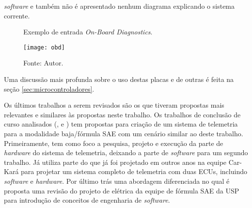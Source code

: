 \textit{software} e também não é apresentado nenhum diagrama explicando o sistema corrente.    

\begin{figure}[!htb]
	\centering
		\caption{Exemplo de entrada \textit{On-Board Diagnostics}.}
		\texttt{[image: obd]} 
		\caption*{Fonte: Autor.}
		\label{fig:obd}
\end{figure}

Uma discussão mais profunda sobre o uso destas placas e de outras é feita na seção \ref{sec:microcontroladores}. 

Os últimos trabalhos a serem revisados são os que tiveram propostas mais relevantes e similares às propostas neste trabalho. Os trabalhos de conclusão de curso analisados (\cite{Dias2010}, \cite{Nunes2016} e \cite{Pereira2012}) tem propostas para criação de um sistema de telemetria para a modalidade baja/fórmula SAE com um cenário similar ao deste trabalho. Primeiramente,  tem como foco a pesquisa, projeto e execução da parte de \textit{hardware} do sistema de telemetria, deixando a parte de \textit{software} para um segundo trabalho. Já  utiliza parte do que já foi projetado em outros anos na equipe Car-Kará para projetar um sistema completo de telemetria com duas ECUs, incluindo \textit{software} e \textit{hardware}. Por último  trás uma abordagem diferenciada no qual é proposta uma revisão do projeto de elétrica da equipe de fórmula SAE da USP para introdução de conceitos de engenharia de \textit{software}.

